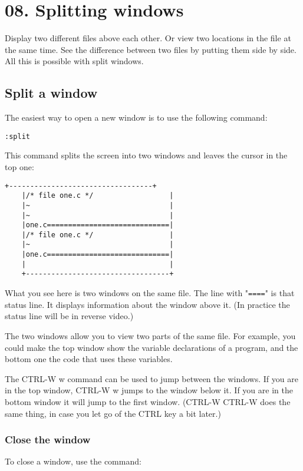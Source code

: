 \section{08. Splitting windows}
Display two different files above each other.
Or view two locations in the file at the same time.
See the difference between two files by putting them side by side.
All this is possible with split windows.
\subsection{Split a window}

The easiest way to open a new window is to use the following command:

 \begin{Verbatim}[samepage=true]
 :split
 \end{Verbatim}

This command splits the screen into two windows and leaves the cursor in the top one:

\begin{Verbatim}[samepage=true]
    +----------------------------------+
    |/* file one.c */                  |
    |~                                 |
    |~                                 |
    |one.c=============================|
    |/* file one.c */                  |
    |~                                 |
    |one.c=============================|
    |                                  |
    +----------------------------------+
\end{Verbatim}

What you see here is two windows on the same file.
The line with "\texttt{====}" is that status line.
It displays information about the window above it.
(In practice the status line will be in reverse video.)

The two windows allow you to view two parts of the same file.
For example, you could make the top window show the variable declarations of a program, and the bottom one the code that uses these variables.

The CTRL-W w command can be used to jump between the windows.
If you are in the top window, CTRL-W w jumps to the window below it.
If you are in the bottom window it will jump to the first window.
(CTRL-W CTRL-W does the same thing, in case you let go of the CTRL key a bit later.)

\subsubsection{Close the window}
To close a window, use the command:

